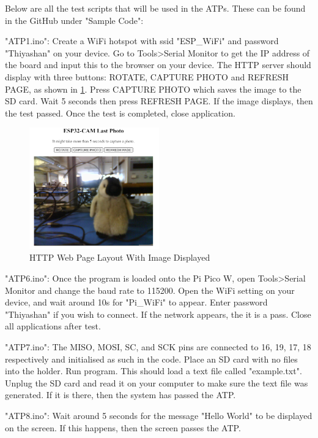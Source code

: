 \documentclass[class=report,11pt,crop=false]{standalone}
\begin{document}
Below are all the test scripts that will be used in the ATPs. These can be found in the GitHub under "Sample Code":

"ATP1.ino": Create a WiFi hotspot with ssid "ESP\_WiFi" and password "Thiyashan" on your device. Go to Tools>Serial Monitor to get the IP address of the board and input this to the browser on your device. The HTTP server should display with three buttons: ROTATE, CAPTURE PHOTO and REFRESH PAGE, as shown in \ref{fig:ATP1_Test}. Press CAPTURE PHOTO which saves the image to the SD card. Wait 5 seconds then press REFRESH PAGE. If the image displays, then the test passed. Once the test is completed, close application. \cite{randomnerdtutorialsESP32CAMTake}

\begin{figure}[h]
\centering
\includegraphics[width=0.5\textwidth]{Images/ATP1.png}
\caption{HTTP Web Page Layout With Image Displayed}
\label{fig:ATP1_Test}
\end{figure}

"ATP6.ino": Once the program is loaded onto the Pi Pico W, open Tools>Serial Monitor and change the baud rate to 115200. Open the WiFi setting on your device, and wait around 10s for "Pi\_WiFi" to appear. Enter password "Thiyashan" if you wish to connect. If the network appears, the it is a pass. Close all applications after test.

"ATP7.ino": The MISO, MOSI, SC, and SCK pins are connected to 16, 19, 17, 18 respectively and initialised as such in the code. Place an SD card with no files into the holder. Run program. This should load a text file called "example.txt". Unplug the SD card and read it on your computer to make sure the text file was generated. If it is there, then the system has passed the ATP. 

"ATP8.ino": Wait around 5 seconds for the message "Hello World" to be displayed on the screen. If this happens, then the screen passes the ATP. 
\end{document}
